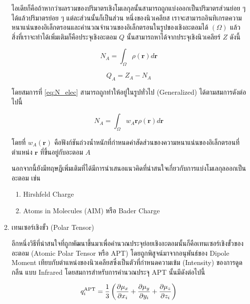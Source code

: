 \begin{enumerate}
    ไอเดียก็คือถ้าหากว่าผลรวมของปริมาตรเชิงโมเลกุลนั้นสามารถถูกแบ่งออกเป็นปริมาตรส่วนย่อย ๆ ได้แล้วปริมาตรย่อย ๆ แต่ละส่วนนั้นก็เป็นส่วน%
    หนึ่งของนิวเคลียส เราจะสามารถอินทิเกรตความหนาแน่นของอิเล็กตรอนและคำนวณจำนวนของอิเล็กตรอนในรูปของเชิงอะตอมได้ $(\Omega)$ 
    แล้วสิ่งที่เราจะทำได้เพิ่มเติมก็คือประจุเชิงอะตอม $Q$ นั้นสามารถหาได้จากประจุเชิงนิวเคลียร์ $Z$ ดังนี้

    \begin{equation}\label{eq:N_elec}
        N_{A} = \int_{\Omega} \rho(\bm{r}) d\bm{r}
    \end{equation}

    \begin{equation}
        Q_{A} = Z_{A} - N_{A}
    \end{equation}

    \noindent โดยสมการที่ \ref{eq:N_elec} สามารถถูกทำให้อยู่ในรูปทั่วไป (Generalized) ได้ตามสมการดังต่อไปนี้
    
    \begin{equation}\label{eq:N_elec_general}
        N_{A} = \int_{\Omega} w_{A}\bm{r} \rho(\bm{r}) d\bm{r}
    \end{equation}

    \noindent โดยที่ $w_{A}(\bm{r})$ คือฟังก์ชันถ่วงน้ำหนักที่กำหนดค่าสัดส่วนของความหนาแน่นของอิเล็กตรอนที่ตำแหน่ง $\bm{r}$ 
    ที่ขึ้นอยู่กับอะตอม $A$

    นอกจากนี้ยังมีทฤษฎีเพิ่มเติมที่ได้มีการนำเสนอแนวคิดที่น่าสนใจเกี่ยวกับการแบ่งโมเลกุลออกเป็นอะตอม เช่น 

    \begin{enumerate}
        \item Hirshfeld Charge\autocite{hirshfeld1977}
        
        \item Atoms in Molecules (AIM) หรือ Bader Charge\autocite{bader1985,bader1991}
    \end{enumerate}
    
    \item เทนเซอร์เชิงขั้ว (Polar Tensor)\autocite{person1974,milani2010}
    
    อีกหนึ่งวิธีที่น่าสนใจที่ถูกพัฒนาขึ้นมาเพื่อคำนวณประจุย่อยเชิงอะตอมนั้นก็คือเทนเซอร์เชิงขั้วของอะตอม (Atomic Polar Tensor หรือ APT) 
    โดยถูกพิสูจน์มาจากอนุพันธ์ของ Dipole Moment เทียบกับตำแหน่งของนิวเคลียสซึ่งเป็นตัวที่กำหนดความเข้ม (Intensity) ของการดูดกลืน%
    แบบ Infrared โดยสมการสำหรับการคำนวณประจุ APT นั้นมีดังต่อไปนี้

    \begin{equation}\label{eq:apt_chage}
        q^{\text{APT}}_{i} = \frac{1}{3} \left( \pdv{\mu_{x}}{x_{i}} + \pdv{\mu_{y}}{y_{i}} 
        + \pdv{\mu_{z}}{z_{i}} \right)
    \end{equation}


\end{enumerate}
